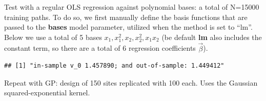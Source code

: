 \documentclass[]{article}
\newenvironment{Shaded}{\begin{snugshade}}{\end{snugshade}}
\newcommand{\KeywordTok}[1]{\textcolor[rgb]{0.13,0.29,0.53}{\textbf{#1}}}
\newcommand{\DataTypeTok}[1]{\textcolor[rgb]{0.13,0.29,0.53}{#1}}
\newcommand{\DecValTok}[1]{\textcolor[rgb]{0.00,0.00,0.81}{#1}}
\newcommand{\StringTok}[1]{\textcolor[rgb]{0.31,0.60,0.02}{#1}}
\newcommand{\CommentTok}[1]{\textcolor[rgb]{0.56,0.35,0.01}{\textit{#1}}}
\newcommand{\ControlFlowTok}[1]{\textcolor[rgb]{0.13,0.29,0.53}{\textbf{#1}}}
\newcommand{\OperatorTok}[1]{\textcolor[rgb]{0.81,0.36,0.00}{\textbf{#1}}}
\newcommand{\NormalTok}[1]{#1}
\begin{document}
Test with a regular OLS regression against polynomial bases: a total of
N=15000 training paths. To do so, we first manually define the basis
functions that are passed to the \textbf{bases} model parameter,
utilized when the method is set to ``lm''. Below we use a total of 5
bases \(x_1, x_1^2, x_2, x_2^2, x_1 x_2\) (be default \textbf{lm} also
includes the constant term, so there are a total of 6 regression
coefficients \(\vec{\beta}\)).

\begin{Shaded}
\end{Shaded}

\begin{verbatim}
## [1] "in-sample v_0 1.457890; and out-of-sample: 1.449412"
\end{verbatim}

Repeat with GP: design of 150 sites replicated with 100 each. Uses the
Gaussian squared-exponential kernel.
\end{document}
